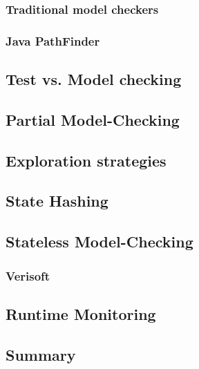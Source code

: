 \documentclass[12pt, a4paper]{book}
\begin{document}
  \subsubsection{Traditional model checkers}
  \label{subs:Traditional model checkers}
  \subsubsection{Java PathFinder}
  \label{subs:Java PathFinder}
  \subsection{Test vs. Model checking}
  \label{sub:Test vs. Model checking}
  \subsection{Partial Model-Checking}
  \label{sub:Partial Model-Checking}
  \subsection{Exploration strategies}
  \label{sub:Exploration strategies}
  \subsection{State Hashing}
  \label{sub:State Hashing}
  \subsection{Stateless Model-Checking}
  \label{sub:Stateless Model-Checking}
  \subsubsection{Verisoft}
  \label{subs:Verisoft}
  \subsection{Runtime Monitoring}
  \label{sub:Runtime Monitoring}
  \subsection{Summary}
  \label{sub:Summary}
\end{document}
